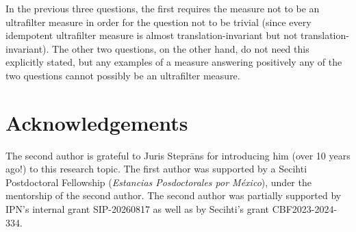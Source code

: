 \documentclass{jloganal}
\theoremstyle{definition}
\begin{document}
In the previous three questions, the first requires the measure not to be an ultrafilter measure in order for the question not to be trivial (since every idempotent ultrafilter measure is almost translation-invariant but not translation-invariant). The other two questions, on the other hand, do not need this explicitly stated, but any examples of a measure answering positively any of the two questions cannot possibly be an ultrafilter measure.

\section*{Acknowledgements}

The second author is grateful to Juris Stepr\={a}ns for introducing him (over 10 years ago!) to this research topic. The first author was supported by a Secihti Postdoctoral Fellowship ({\it Estancias Posdoctorales por México}), under the mentorship of the second author. The second author was partially supported by IPN's internal grant SIP-20260817 as well as by Secihti's grant CBF2023-2024-334.

%
%
%
%
%
\end{document}
